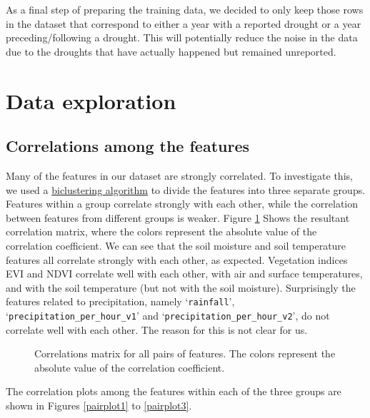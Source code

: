 \documentclass[10pt,parskip=half,
toc=sectionentrywithdots,
bibliography=totocnumbered,
captions=tableheading,numbers=noendperiod]{scrartcl}
\begin{document}
As a final step of preparing the training data, we decided to only keep
those rows in the dataset that correspond to either a year with a
reported drought or a year preceding/following a drought. This will
potentially reduce the noise in the data due to the droughts that have
actually happened but remained unreported.

\hypertarget{data-exploration}{%
\section{Data exploration}\label{data-exploration}}

\hypertarget{correlations-among-the-features}{%
\subsection{Correlations among the
features}\label{correlations-among-the-features}}

Many of the features in our dataset are strongly correlated. To
investigate this, we used a
\href{https://scikit-learn.org/stable/modules/biclustering.html}{biclustering
algorithm} to divide the features into three separate groups. Features
within a group correlate strongly with each other, while the correlation
between features from different groups is weaker. Figure \ref{corr_mat}
Shows the resultant correlation matrix, where the colors represent the
absolute value of the correlation coefficient. We can see that the soil
moisture and soil temperature features all correlate strongly with each
other, as expected. Vegetation indices EVI and NDVI correlate well with
each other, with air and surface temperatures, and with the soil
temperature (but not with the soil moisture). Surprisingly the features
related to precipitation, namely `\texttt{rainfall}',
`\texttt{precipitation\_per\_hour\_v1}' and
`\texttt{precipitation\_per\_hour\_v2}', do not correlate well with each
other. The reason for this is not clear for us.

\begin{figure}[H]\begin{center}\end{center}\caption{Correlations matrix for all pairs of features. The colors represent the
absolute value of the correlation coefficient.}\label{corr_mat}\end{figure}

The correlation plots among the features within each of the three groups
are shown in Figures \ref{pairplot1} to \ref{pairplot3}.
\end{document}
